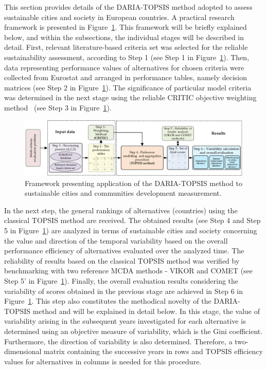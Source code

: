 \documentclass[5p,times]{elsarticle}
\begin{document}
This section provides details of the DARIA-TOPSIS method adopted to assess sustainable cities and society in European countries. A practical research framework is presented in Figure~\ref{fig:practicalFramework}. This framework will be briefly explained below, and within the subsections, the individual stages will be described in detail. First, relevant literature-based criteria set was selected for the reliable sustainability assessment, according to Step 1 (see Step 1 in Figure~\ref{fig:practicalFramework}). Then, data representing performance values of alternatives for chosen criteria were collected from Eurostat and arranged in performance tables, namely decision matrices (see Step 2 in Figure~\ref{fig:practicalFramework}). The significance of particular model criteria was determined in the next stage using the reliable CRITIC objective weighting method~\cite{vzivzovic2020objective} (see Step 3 in Figure~\ref{fig:practicalFramework}). 
%
\begin{figure}[ht!]
    \centering
    \includegraphics[width=\linewidth]{SCSpractical.png}
    \caption{Framework presenting application of the DARIA-TOPSIS method to sustainable cities and communities development measurement.}
    \label{fig:practicalFramework}
\end{figure}
%
In the next step, the general rankings of alternatives (countries) using the classical TOPSIS method are received. The obtained results (see Step 4 and Step 5 in Figure~\ref{fig:practicalFramework}) are analyzed in terms of sustainable cities and society concerning the value and direction of the temporal variability based on the overall performance efficiency of alternatives evaluated over the analyzed time. The reliability of results based on the classical TOPSIS method was verified by benchmarking with two reference MCDA methods - VIKOR and COMET (see Step 5' in Figure~\ref{fig:practicalFramework}). Finally, the overall evaluation results considering the variability of scores obtained in the previous stage are achieved in Step 6 in Figure~\ref{fig:practicalFramework}. This step also constitutes the methodical novelty of the DARIA-TOPSIS method and will be explained in detail below. In this stage, the value of variability arising in the subsequent years investigated for each alternative is determined using an objective measure of variability, which is the Gini coefficient. Furthermore, the direction of variability is also determined. Therefore, a two-dimensional matrix containing the successive years in rows and TOPSIS efficiency values for alternatives in columns is needed for this procedure. 
\end{document}
